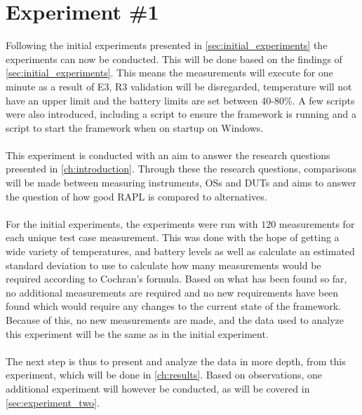 \section{Experiment \#1}\label{sec:experiment_one}

Following the initial experiments presented in \cref{sec:initial_experiments} the experiments can now be conducted. This will be done based on the findings of \cref{sec:initial_experiments}. This means the measurements will execute for one minute as a result of E3, R3 validation will be disregarded, temperature will not have an upper limit and the battery limits are set between 40-80\%. A few scripts were also introduced, including a script to ensure the framework is running and a script to start the framework when on startup on Windows.

\paragraph*{}
This experiment is conducted with an aim to answer the research questions presented in \cref{ch:introduction}. Through these the research questions, comparisons will be made between measuring instruments, OSs and DUTs and aims to answer the question of how good RAPL is compared to alternatives.

\paragraph*{}
For the initial experiments, the experiments were run with $120$ measurements for each unique test case measurement. This was done with the hope of getting a wide variety of temperatures, and battery levels as well as calculate an estimated standard deviation to use to calculate how many measurements would be required according to Cochran's formula. Based on what has been found so far, no additional measurements are required and no new requirements have been found which would require any changes to the current state of the framework. Because of this, no new measurements are made, and the data used to analyze this experiment will be the same as in the initial experiment.

\paragraph*{}
The next step is thus to present and analyze the data in more depth, from this experiment, which will be done in \cref{ch:results}. Based on observations, one additional experiment will however be conducted, as will be covered in \cref{sec:experiment_two}.